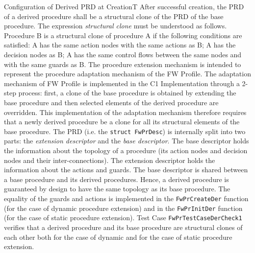 \documentclass[requirements]{../fwprofile}
\begin{document}
\begin{fw_req_note}{Configuration of Derived PRD at Creation}{T}
{After successful creation, the PRD of a derived procedure shall be a structural clone of the PRD of the base procedure.}
{The expression \emph{structural clone} must be understood as follows. Procedure B is a structural clone of procedure A if the following conditions are satisfied: A has the same action nodes with the same actions as B; A has the decision nodes as B; A has the same control flows between the same nodes and with the same guards as B.}
{The procedure extension mechanism is intended to represent the procedure adaptation mechanism of the FW Profile. 
The adaptation mechanism of FW Profile is implemented in the C1 Implementation through a 2-step process: first, a clone of the base procedure is 
obtained by extending the base procedure and then selected elements of the derived procedure are overridden. This implementation of the adaptation 
mechanism therefore requires that a newly derived procedure be a clone for all its structural elements of the base procedure.}
{The PRD (i.e. the \texttt{struct FwPrDesc}) is internally split into two parts: the \emph{extension descriptor} and the 
\emph{base descriptor}. The base descriptor holds the information about the topology of a procedure (its action nodes and decision nodes and 
their inter-connections). The extension descriptor holds the information about the actions and guards. The base descriptor 
is shared between a base procedure and its derived procedures. Hence, a derived procedure is guaranteed by design to have the same topology 
as its base procedure. The equality of the guards and actions  
is implemented in the \texttt{FwPrCreateDer} function (for the case of dynamic procedure extension) and in the \texttt{FwPrInitDer} function 
(for the case of static procedure extension).} 
{Test Case \texttt{FwPrTestCaseDerCheck1} verifies that a derived procedure and 
its base procedure are structural clones of each other both for the case of dynamic and for the case of 
static procedure extension.}
\end{fw_req_note}
\end{document}
